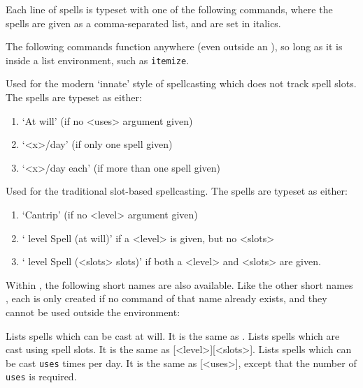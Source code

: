 			Each line of spells is typeset with one of the following commands, where the spells are given as a comma-separated list, and are set in italics.

			The following commands function anywhere (even outside an ), so long as it is inside a list environment, such as \texttt{itemize}.
			{
				Used for the modern `innate' style of spellcasting which does not track spell slots. The spells are typeset as either:
				\begin{enumerate}
					\item `At will' (if no <uses> argument given)
					\item `<x>/day' (if only one spell given)
					\item `<x>/day each' (if more than one spell given)
				\end{enumerate}
			}
			{
				Used for the traditional slot-based spellcasting. The spells are typeset as either:
				\begin{enumerate}
					\item `Cantrip' (if no <level> argument given)

					\item ` level Spell (at will)' if a <level> is given, but no <slots>
					\item ` level Spell (<slots> slots)' if both a <level> and <slots> are given.
				\end{enumerate}
			}

			Within , the following short names are also available. Like the other short names , each is only created if no command of that name already exists, and they cannot be used outside the environment:

			{
				Lists spells which can be cast at will. It is the same as .
			}
			{
				Lists spells which are cast using spell slots. It is the same as [<level>][<slots>].
			}
			{
				Lists spells which can be cast \texttt{uses} times per day. It is the same as [<uses>], except that the number of \texttt{uses} is required.
			}

